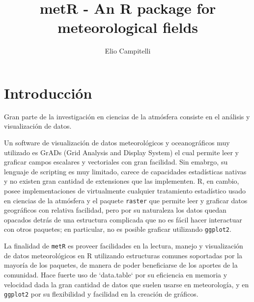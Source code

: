\documentclass[runningheads]{llncs}
\begin{document}


\title{metR - An R package for meteorological fields}

%
\author{Elio Campitelli}

%
%
%
\maketitle              %
%




\section{Introducción}


Gran parte de la investigación en ciencias de la atmósfera consiste en el análisis y visualización de datos.

Un software de visualización de datos meteorológicos y oceanográficos muy utilizado es GrADs (Grid Analysis and Display System) el cual permite leer y graficar campos escalares y vectoriales con gran facilidad. Sin emabrgo, su lenguaje de scripting es muy limitado, carece de capacidades estadísticas nativas y no existen gran cantidad de extensiones que las implementen. R, en cambio, posee implementaciones de virtualmente cualquier tratamiento estadístico usado en ciencias de la atmósfera y el paquete \texttt{raster} que permite leer y graficar datos geográficos con relativa facilidad, pero por su naturaleza los datos quedan opacados detrás de una estructura complicada que no es fácil hacer interactuar con otros paquetes; en particular, no es posible graficar utilizando \texttt{ggplot2}. 

La finalidad de \texttt{metR} es proveer facilidades en la lectura, manejo y visualización de datos meteorológicos en R utilizando estructuras comunes soportadas por la mayoría de los paquetes, de manera de poder beneficiarse de los aportes de la comunidad. Hace fuerte uso de `data.table` por su eficiencia en memoria y velocidad dada la gran cantidad de datos que suelen usarse en meteorología, y en \texttt{ggplot2} por su flexibilidad y facilidad en la creación de gráficos. 
\end{document}
